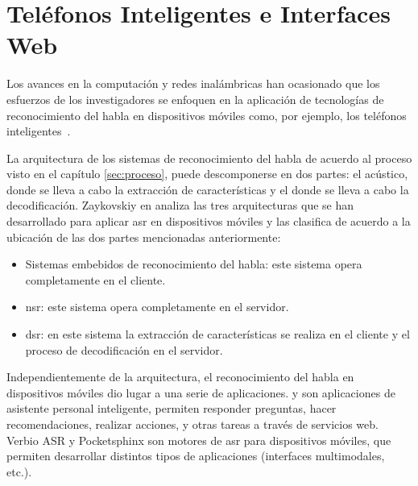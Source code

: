 \section{Tel\'efonos Inteligentes e Interfaces Web}
\label{sec:smartphones}

Los avances en la computaci\'on y redes inal\'ambricas han ocasionado
que los esfuerzos de los investigadores se enfoquen en la aplicaci\'on de tecnolog\'ias de
reconocimiento del habla en dispositivos m\'oviles como, por ejemplo, los tel\'efonos 
\mbox{inteligentes \cite{TanAutomatic2008}}.

La arquitectura de los sistemas de reconocimiento del habla de acuerdo al proceso visto en el 
cap\'itulo \ref{sec:proceso}, puede descomponerse en dos partes: el  ac\'ustico,
donde se lleva a cabo la extracci\'on de caracter\'isticas  y el  donde se 
lleva a cabo la decodificaci\'on. 
Zaykovskiy en \cite{ZaykovskiySurvey2006} analiza las tres arquitecturas que se han desarrollado
para aplicar \gls{asr} en dispositivos m\'oviles y las clasifica de acuerdo a la ubicaci\'on de las 
dos partes mencionadas anteriormente:

\begin{itemize}
    \item Sistemas embebidos de reconocimiento del habla: este sistema opera completamente en el cliente.
    \item \gls{nsr}: este sistema opera completamente en el servidor. 
    \item \gls{dsr}: en este sistema la extracci\'on de caracter\'isticas se realiza
        en el cliente y el proceso de decodificaci\'on en el servidor.
\end{itemize}

Independientemente de la arquitectura, el reconocimiento del habla en dispositivos m\'oviles 
dio lugar a una serie de aplicaciones.  \cite{AppleSiri, OneAccordSiri} y 
 \cite{GoogleNow} son aplicaciones de asistente personal inteligente, permiten 
responder preguntas, hacer recomendaciones, realizar acciones, y otras tareas a trav\'es de servicios web. 
Verbio ASR \cite{VerbioASR} y Pocketsphinx \cite{HugginsDainesPocketSphinx2006, PocketSphinxHomePage} son 
motores de \gls{asr} para dispositivos m\'oviles, que permiten desarrollar distintos tipos de aplicaciones 
(interfaces multimodales, etc.).

